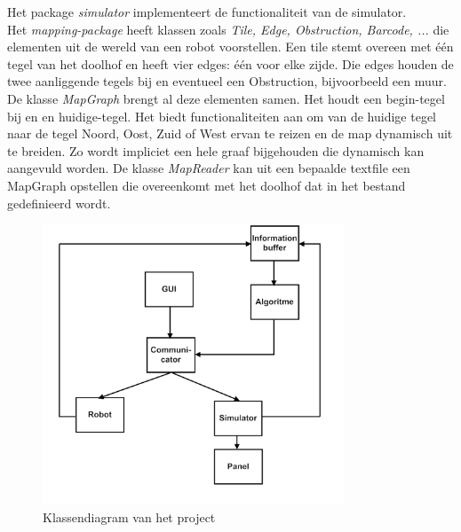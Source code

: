 \documentclass[tt3]{penoverslag}
\begin{document}
Het package \textit{simulator} implementeert de functionaliteit van de simulator. \\
Het \textit{mapping-package} heeft klassen zoals \textit{Tile, Edge, Obstruction, Barcode, ...} die elementen uit de wereld van een robot voorstellen. Een tile stemt overeen met \'e\'en tegel van het doolhof en heeft vier edges: \'e\'en voor elke zijde. Die edges houden de twee aanliggende tegels bij en eventueel een Obstruction, bijvoorbeeld een muur. De klasse \textit{MapGraph} brengt al deze elementen samen. Het houdt een begin-tegel bij en en huidige-tegel. Het biedt functionaliteiten aan om van de huidige tegel naar de tegel Noord, Oost, Zuid of West ervan te reizen en de map dynamisch uit te breiden. Zo wordt impliciet een hele graaf bijgehouden die dynamisch kan aangevuld worden. De klasse \textit{MapReader} kan uit een bepaalde textfile een MapGraph opstellen die overeenkomt met het doolhof dat in het bestand gedefinieerd wordt.


\begin{figure}[tbp]
\begin{center}
    \includegraphics[width=0.8\textwidth]{Klassendiagram}
    \caption{Klassendiagram van het project}
    \label{fig:klasDia}
\end{center}
\end{figure}


\end{document}
